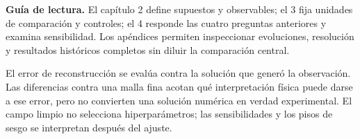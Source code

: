 \textbf{Guía de lectura.} El capítulo 2 define supuestos y observables; el 3 fija unidades de comparación y controles; el 4 responde las cuatro preguntas anteriores y examina sensibilidad. Los apéndices permiten inspeccionar evoluciones, resolución y resultados históricos completos sin diluir la comparación central.

El error de reconstrucción se evalúa contra la solución que generó la observación. Las diferencias contra una malla fina acotan qué interpretación física puede darse a ese error, pero no convierten una solución numérica en verdad experimental. El campo limpio no selecciona hiperparámetros; las sensibilidades y los pisos de sesgo se interpretan después del ajuste.
